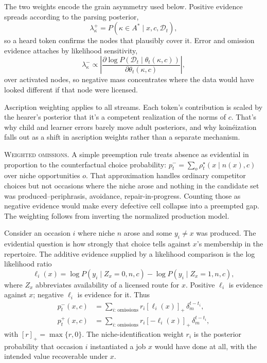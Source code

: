 \documentclass[12pt,letterpaper]{article}
\begin{document}
The two weights encode the grain asymmetry used below. Positive evidence spreads
according to the parsing posterior,
\begin{equation*}
\lambda^+_\kappa=P(\kappa\in A^\ast\mid x,c,\mathcal{D}_t),
\end{equation*}
so a heard token confirms the nodes that plausibly cover it. Error and omission
evidence attaches by likelihood sensitivity,
\begin{equation*}
\lambda^-_\kappa\propto
\left|
\frac{\partial\log P(\mathcal{D}_t\mid\theta_t(\kappa,c))}
{\partial\theta_t(\kappa,c)}
\right|,
\end{equation*}
over activated nodes, so negative mass concentrates where the data would have
looked different if that node were licensed.

Ascription weighting applies to all streams. Each token's contribution is scaled by
the hearer's posterior that it's a competent realization of the norms of $c$.
That's why child and learner errors barely move adult posteriors, and why
koinéization falls out as a shift in ascription weights rather than a separate
mechanism.

\noindent\textsc{Weighted omissions.} A simple preemption rule treats absence as
evidential in proportion to the counterfactual choice probability:
$p_t^-=\sum_o\rho_t^\star(x\mid n(x),c)$ over niche opportunities $o$. That
approximation handles ordinary competitor choices but not occasions where the
niche arose and nothing in the candidate set was produced--periphrasis,
avoidance, repair-in-progress. Counting those as negative evidence would make
every defective cell collapse into a preempted gap. The weighting follows from
inverting the normalized production model.

Consider an occasion $i$ where niche $n$ arose and some $y_i\neq x$ was
produced. The evidential question is how strongly that choice tells against
$x$'s membership in the repertoire. The additive evidence supplied by a
likelihood comparison is the log likelihood ratio
\begin{equation}
\ell_i(x)=
\log P(y_i\mid Z_x=0,n,c)-
\log P(y_i\mid Z_x=1,n,c),
\label{eq:attributability}
\end{equation}
where $Z_x$ abbreviates availability of a licensed route for $x$. Positive
$\ell_i$ is evidence against $x$; negative $\ell_i$ is evidence for it. Thus
\begin{align}
p_t^-(x,c) &= \sum_{i:\,\text{omissions}} r_i[\ell_i(x)]_+\,
  \delta_m^{t-t_i},\\
p_t^+(x,c) &= \sum_{i:\,\text{omissions}} r_i[-\ell_i(x)]_+\,
  \delta_m^{t-t_i},
\label{eq:preemption-mass}
\end{align}
with $[r]_+=\max\{r,0\}$. The niche-identification weight $r_i$ is the posterior
probability that occasion $i$ instantiated a job $x$ would have done at all,
with the intended value recoverable under $x$.
\end{document}
